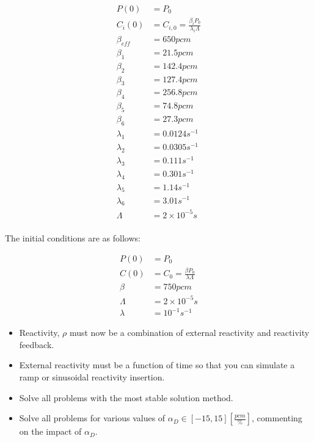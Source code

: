\documentclass{article}
\begin{document}
\begin{align*}
        P(0) &=P_0\\
        C_i(0) &= C_{i,0} = \frac{\beta_i P_0}{\lambda_i\Lambda}\\
        \beta_{eff} &= 650pcm\\
        \beta_1 &= 21.5 pcm\\
        \beta_2 &= 142.4 pcm\\
        \beta_3 &= 127.4 pcm\\
        \beta_4 &= 256.8 pcm\\
        \beta_5 &= 74.8 pcm\\
        \beta_6 &= 27.3 pcm\\
        \lambda_1 &= 0.0124 s^{-1}\\
        \lambda_2 &= 0.0305 s^{-1}\\
        \lambda_3 &= 0.111 s^{-1}\\
        \lambda_4 &= 0.301 s^{-1}\\
        \lambda_5 &= 1.14 s^{-1}\\
        \lambda_6 &= 3.01 s^{-1}\\
        \Lambda &= 2\times 10^{-5}s\\
\end{align*}

The initial conditions are as follows:

\begin{align}
        P(0) &=P_0\\
        C(0) &= C_0 = \frac{\beta P_0}{\lambda\Lambda}\\
        \beta &= 750pcm\\
        \Lambda &= 2\times 10^{-5}s\\
        \lambda &= 10^{-1}s^{-1}
\end{align}

\begin{itemize}
        \item Reactivity, $\rho$ must now be a combination of external 
                reactivity and reactivity feedback. 
        \item External reactivity must be a 
                function of time so that you can simulate a ramp or sinusoidal 
                reactivity insertion.
        \item Solve all problems with the most stable solution method.
        \item Solve all problems for various values of $\alpha_D \in \left[-15, 
                15\right]\left[\frac{pcm}{\%}\right]$, commenting on the impact 
                of $\alpha_D$.
\end{itemize}
\end{document}

